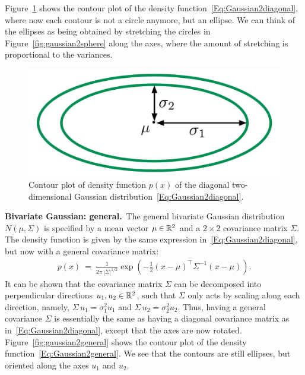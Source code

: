 \documentclass[11pt]{article}
\begin{document}
Figure~\ref{fig:gaussian2diagonal} shows the contour plot of the density function~\eqref{Eq:Gaussian2diagonal}, where now each contour is not a circle anymore, but an ellipse. We can think of the ellipses as being obtained by stretching the circles in Figure~\ref{fig:gaussian2sphere} along the axes, where the amount of stretching is proportional to the variances.

\begin{figure}[h!]
\centering
\includegraphics[scale=0.25]{diagonalGaussian}
\caption{Contour plot of density function $p(x)$ of the diagonal two-dimensional Gaussian distribution~\eqref{Eq:Gaussian2diagonal}.}
\label{fig:gaussian2diagonal}
\end{figure}

\smallskip
{\bf Bivariate Gaussian: general.}~The general bivariate Gaussian distribution $N(\mu,\Sigma)$ is specified by a mean vector $\mu \in \mathbb{R}^2$ and a $2 \times 2$ covariance matrix $\Sigma$. The density function is given by the same expression in~\eqref{Eq:Gaussian2diagonal}, but now with a general covariance matrix:
\begin{align}\label{Eq:Gaussian2general}
p(x) ~=~ \frac{1}{2\pi \, |\Sigma|^{1/2}} \exp \left(- \frac{1}{2} (x - \mu)^\top \Sigma^{-1} (x-\mu) \right).
\end{align}
It can be shown that the covariance matrix $\Sigma$ can be decomposed into perpendicular directions $u_1, u_2 \in \mathbb{R}^2$, such that $\Sigma$ only acts by scaling along each direction, namely, $\Sigma \, u_1 = \sigma_1^2 u_1$ and $\Sigma \, u_2 = \sigma_2^2 u_2$. Thus, having a general covariance $\Sigma$ is essentially the same as having a diagonal covariance matrix as in~\eqref{Eq:Gaussian2diagonal}, except that the axes are now rotated. Figure~\ref{fig:gaussian2general} shows the contour plot of the density function~\eqref{Eq:Gaussian2general}. We see that the contours are still ellipses, but oriented along the axes $u_1$ and $u_2$.
\end{document}
